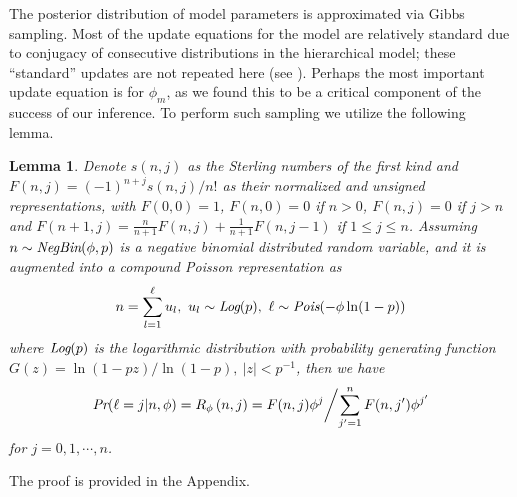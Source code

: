 \documentclass[journal]{IEEEtran}
\newcommand{\beq}{\begin{equation}}
\newcommand{\eeq}{\end{equation}}
\newtheorem{lem}[thm]{Lemma}
\begin{document}
The posterior distribution of model parameters is approximated via Gibbs sampling. Most of the update equations for the model are relatively standard due to conjugacy of consecutive distributions in the hierarchical model; these ``standard'' updates are not repeated here (see \cite{Bo2011}). Perhaps the most important update equation is for $\phi_m$, as we found this to be a critical component of the success of our inference. To perform such sampling we utilize the following lemma.
\begin{lem}\label{lem:NBinference} Denote $s(n,j)$ as the Sterling numbers of the first kind \cite{johnson2005univariate} and $F(n,j) = (-1)^{n+j}s(n,j)/n!$ as their normalized and unsigned representations, with $F(0,0)=1$, $F(n,0) = 0$ if $n>0$, $F(n,j)=0$ if $j>n$ and
$F(n+1,j) =\frac{n }{n+1}F(n,j) + \frac{1}{n+1}F(n,j - 1)$
if $1\le j\le n$. Assuming $n\sim\emph{\mbox{NegBin}}(\phi,p)$ is a negative binomial distributed random variable, and it is augmented into a compound Poisson representation \cite{Anscombe1949} as  \beq n  = \sum_{l=1}^{\ell} u_{l},~ u_{l}\sim \emph{\mbox{Log}}(p),~ \ell\sim\emph{\mbox{Pois}}(-\phi\ln(1-p))\eeq where $\emph{\mbox{Log}}(p)$ is the logarithmic distribution \cite{Anscombe1949}  with probability generating function $G(z)=
{\ln(1-pz)}/{\ln(1-p)},~ |z|<{p^{-1}}$, then we have
\beq
\emph{\mbox{Pr}}(\ell= j | n,\phi) = R_{\phi}\left(n,j\right) =  {F(n,j) \phi^{j} }\bigg/{{\sum_{j'=1}^{n}F(n,j') \phi^{j'} }}\eeq for $j=0,1,\cdots,n$.

\end{lem}

The proof is provided in the Appendix.
\end{document}
